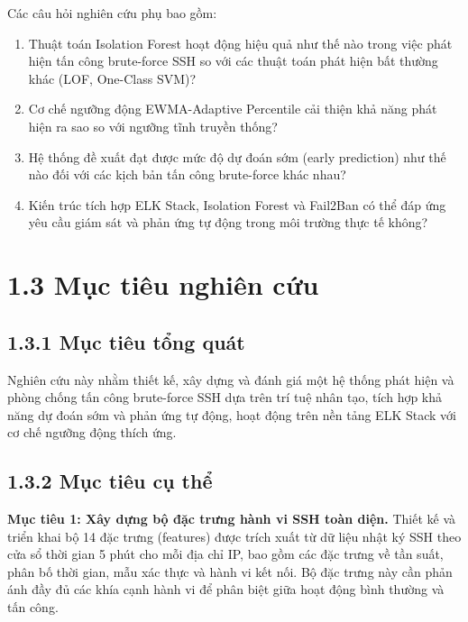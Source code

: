 \documentclass[
  a4paper]{report}
\providecommand{\tightlist}{%
  \setlength{\itemsep}{0pt}\setlength{\parskip}{0pt}}
\begin{document}
Các câu hỏi nghiên cứu phụ bao gồm:

\begin{enumerate}
\def\labelenumi{\arabic{enumi}.}
\tightlist
\item
  Thuật toán Isolation Forest hoạt động hiệu quả như thế nào trong việc
  phát hiện tấn công brute-force SSH so với các thuật toán phát hiện bất
  thường khác (LOF, One-Class SVM)?
\item
  Cơ chế ngưỡng động EWMA-Adaptive Percentile cải thiện khả năng phát
  hiện ra sao so với ngưỡng tĩnh truyền thống?
\item
  Hệ thống đề xuất đạt được mức độ dự đoán sớm (early prediction) như
  thế nào đối với các kịch bản tấn công brute-force khác nhau?
\item
  Kiến trúc tích hợp ELK Stack, Isolation Forest và Fail2Ban có thể đáp
  ứng yêu cầu giám sát và phản ứng tự động trong môi trường thực tế
  không?
\end{enumerate}

\section{1.3 Mục tiêu nghiên
cứu}\label{mux1ee5c-tiuxeau-nghiuxean-cux1ee9u}

\subsection{1.3.1 Mục tiêu tổng
quát}\label{mux1ee5c-tiuxeau-tux1ed5ng-quuxe1t}

Nghiên cứu này nhằm thiết kế, xây dựng và đánh giá một hệ thống phát
hiện và phòng chống tấn công brute-force SSH dựa trên trí tuệ nhân tạo,
tích hợp khả năng dự đoán sớm và phản ứng tự động, hoạt động trên nền
tảng ELK Stack với cơ chế ngưỡng động thích ứng.

\subsection{1.3.2 Mục tiêu cụ
thể}\label{mux1ee5c-tiuxeau-cux1ee5-thux1ec3}

\textbf{Mục tiêu 1: Xây dựng bộ đặc trưng hành vi SSH toàn diện.} Thiết
kế và triển khai bộ 14 đặc trưng (features) được trích xuất từ dữ liệu
nhật ký SSH theo cửa sổ thời gian 5 phút cho mỗi địa chỉ IP, bao gồm các
đặc trưng về tần suất, phân bố thời gian, mẫu xác thực và hành vi kết
nối. Bộ đặc trưng này cần phản ánh đầy đủ các khía cạnh hành vi để phân
biệt giữa hoạt động bình thường và tấn công.
\end{document}
